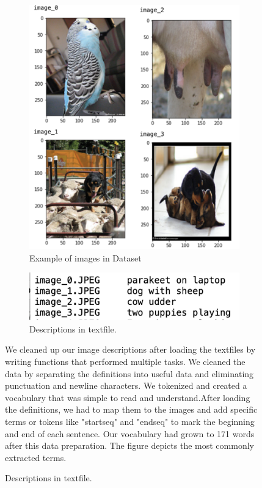 \documentclass[conference]{IEEEtran}
\begin{document}
\begin{figure}[htbp]
\begin{figure}[htbp]
\centerline{\includegraphics[width=\linewidth]{sampleimages.png}}
\caption{Example of images in Dataset}
\label{fig3}
\end{figure}

\begin{figure}[htbp]
\centerline{\includegraphics[width=\linewidth]{sampletext.png}}
\caption{Descriptions in textfile.}
\label{fig4}
\end{figure}

We cleaned up our image descriptions after loading the textfiles by writing functions that performed multiple tasks. We cleaned the data by separating the definitions into useful data and eliminating punctuation and newline characters. We tokenized and created a vocabulary that was simple to read and understand.After loading the definitions, we had to map them to the images and add specific terms or tokens like "startseq" and "endseq" to mark the beginning and end of each sentence. Our vocabulary had grown to 171 words after this data preparation. The figure depicts the most commonly extracted terms. 


\end{figure}
\end{document}
